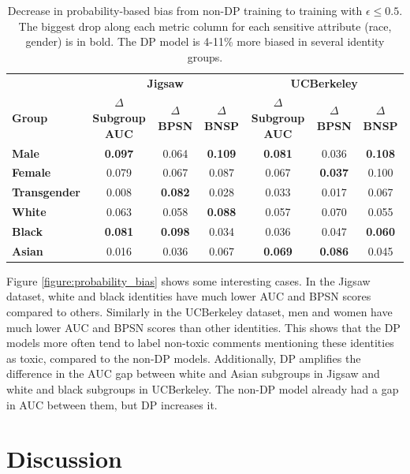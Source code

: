 \documentclass[11pt]{article} %
\begin{document}
\begin{table}[!htbp]
\centering
\begin{adjustbox}{max width=0.85\textwidth}
\begin{tabular}{@{}lccc|ccc@{}}
\toprule
& \multicolumn{3}{c}{\textbf{Jigsaw}} & \multicolumn{3}{c}{\textbf{UCBerkeley}} \\
 \textbf{Group} & \textbf{$\Delta$ Subgroup AUC}  & \textbf{$\Delta$ BPSN} & \textbf{$\Delta$ BNSP} & \textbf{$\Delta$ Subgroup AUC}  & \textbf{$\Delta$ BPSN} & \textbf{$\Delta$ BNSP} \\ \midrule
\textbf{Male} & \textbf{0.097} & 0.064 & \textbf{0.109} & \textbf{0.081} & 0.036& \textbf{0.108}\\
\textbf{Female} & 0.079 & 0.067 & 0.087 &0.067 & \textbf{0.037} & 0.100\\
\textbf{Transgender} & 0.008 & \textbf{0.082} & 0.028 & 0.033 & 0.017& 0.067\\ \midrule
\textbf{White} & 0.063 & 0.058 & \textbf{0.088}  & 0.057 & 0.070 & 0.055\\
\textbf{Black} & \textbf{0.081} & \textbf{0.098} & 0.034& 0.036 & 0.047& \textbf{0.060}\\
\textbf{Asian} & 0.016 & 0.036 & 0.067 & \textbf{0.069} & \textbf{0.086} & 0.045 \\

\bottomrule
\end{tabular}
\end{adjustbox}
\caption{Decrease in probability-based bias from non-DP training to training with $\epsilon \le 0.5$. The biggest drop along each metric column for each sensitive attribute (race, gender) is in bold. The DP model is 4-11\% more biased in several identity groups.}
\label{table:probability_bias}
\end{table}

Figure \ref{figure:probability_bias} shows some interesting cases. In the Jigsaw dataset, white and black identities have much lower AUC and BPSN scores compared to others. Similarly in the UCBerkeley dataset, men and women have much lower AUC and BPSN scores than other identities. This shows that the DP models more often tend to label non-toxic comments mentioning these identities as toxic, compared to the non-DP models. Additionally, DP amplifies the difference in the AUC gap between white and Asian subgroups in Jigsaw and white and black subgroups in UCBerkeley. The non-DP model already had a gap in AUC between them, but DP increases it. 

\section{Discussion \label{sec:discussion}}
\end{document}
